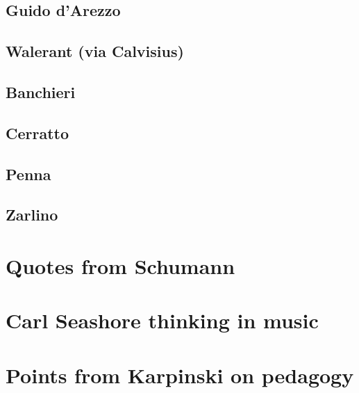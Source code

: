 \documentclass[]{book}
\theoremstyle{definition}
\theoremstyle{definition}
\theoremstyle{definition}
\theoremstyle{remark}
\begin{document}
\hypertarget{guido-darezzo}{%
\subsection{Guido d'Arezzo}\label{guido-darezzo}}

\hypertarget{walerant-via-calvisius}{%
\subsection{Walerant (via Calvisius)}\label{walerant-via-calvisius}}

\hypertarget{banchieri}{%
\subsection{Banchieri}\label{banchieri}}

\hypertarget{cerratto}{%
\subsection{Cerratto}\label{cerratto}}

\hypertarget{penna}{%
\subsection{Penna}\label{penna}}

\hypertarget{zarlino}{%
\subsection{Zarlino}\label{zarlino}}

\hypertarget{quotes-from-schumann}{%
\section{Quotes from Schumann}\label{quotes-from-schumann}}

\hypertarget{carl-seashore-thinking-in-music}{%
\section{Carl Seashore thinking in
music}\label{carl-seashore-thinking-in-music}}

\hypertarget{points-from-karpinski-on-pedagogy}{%
\section{Points from Karpinski on
pedagogy}\label{points-from-karpinski-on-pedagogy}}
\end{document}

